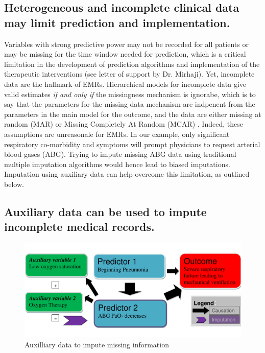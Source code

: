 \documentclass[11pt,notitlepage]{article}
\begin{document}
\subsection*{Heterogeneous and incomplete clinical data may limit prediction and implementation.}
Variables with strong predictive power may not be recorded for all patients 
or may be missing for the time window needed for prediction, which is a critical limitation 
in the development of prediction algorithms and implementation of the 
therapeutic interventions (see letter of support by Dr. Mirhaji). 
Yet, incomplete data are the hallmark of EMRs. 
Hierarchical models for incomplete data give valid estimates 
\textit{if and only if} the missingness mechanism is ignorabe, which is to say that the parameters 
for the missing data mechanism are indpenent from the parameters in the main model for the 
outcome, and the data are either missing at random (MAR) or Missing Completely At Random 
(MCAR) \cite{Rubin1976}. Indeed, these assumptions are unreasonale for EMRs. In our example, only 
significant respiratory co-morbidity and symptoms will prompt physicians to request arterial blood gases (ABG). Trying to 
impute missing ABG data using traditional multiple imputation algorithms would hence lead to biased 
imputations. Imputation using auxiliary data can help overcome this limitation, as outlined below.

\subsection*{Auxiliary data can be used to impute incomplete medical records.} 

\begin{figure} 
 \vspace{-25pt}
 \includegraphics[scale=0.4]{Figures/Bayesian_imputation.pdf}
    \vspace{-20pt}
  \caption{Auxilliary data to impute missing information}
   \vspace{-15pt}
   \label{fig:Imputation_fig}
\end{figure}
\end{document}
